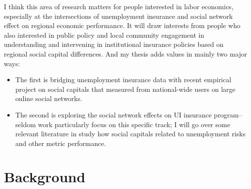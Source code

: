 \documentclass{article}
\begin{document}

I think this area of research matters for people interested in labor economics, especially at the intersections of unemployment insurance and social network effect on regional economic performance. It will draw interests from people who also interested in public policy and local community engagement in understanding and intervening in institutional insurance policies based on regional social capital differences. And my thesis adds values in mainly two major ways: 
\begin{itemize}
\item The first is bridging unemployment insurance data with recent empirical project on social capitals that measured from national-wide users on large online social networks.

\item The second is exploring the social network effects on UI insurance program--seldom work particularly focus on this specific track; I will go over some relevant literature in study how social capitals related to unemployment risks and other metric performance.
 
\end{itemize}



\section{Background}
\end{document}
